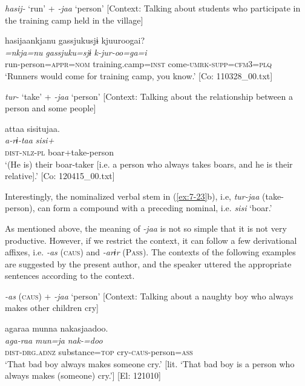 \ea \label{ex:7:23}\ea \label{ex:7:a}\textit{hasij-} ‘run’ + \textit{{}-jaa} ‘person’ [Context: Talking about students who participate in the training camp held in the village]

{\TM}
\glll  hasijaankjanu  {\textbar}gassjuku{\textbar}sjɨ  kjuuroogai?\\
\textit{=nkja=nu}  \textit{gassjuku=sjɨ}  \textit{k-jur-oo=ga=i}\\
run-person=\textsc{appr}=\textsc{nom}  training.camp=\textsc{inst}  come-\textsc{umrk}-\textsc{supp}=\textsc{cfm}3=\textsc{plq}\\
\glt ‘Runners would come for training camp, you know.’ [Co: 110328\_00.txt]

\ex \label{ex:7:b}\textit{tur-} ‘take’ + \textit{{}-jaa} ‘person’ [Context: Talking about the relationship between a person and some people]

{\TM}
\glll  attaa   sisitujaa.\\
\textit{a-rɨ-taa}  \textit{sisi+}\\
\textsc{dist}-\textsc{nlz}-\textsc{pl}  boar+take-person\\
\glt ‘(He is) their boar-taker [i.e. a person who always takes boars, and he is their relative].’ [Co: 120415\_00.txt]

\z
\z

Interestingly, the nominalized verbal stem in (\ref{ex:7-23}b), i.e, \textit{tur-jaa} (take-person), can form a compound with a preceding nominal, i.e. \textit{sisi} ‘boar.’

As mentioned above, the meaning of \textit{{}-jaa} is not so simple that it is not very productive. However, if we restrict the context, it can follow a few derivational affixes, i.e. \textit{{}-as} (\textsc{caus}) and \textit{{}-arɨr} (P\textsc{ass}). The contexts of the following examples are suggested by the present author, and the speaker uttered the appropriate sentences according to the context.

\ea \label{ex:7:24}
\ea \label{ex:7:24a}\textit{{}-as} (\textsc{caus}) + \textit{{}-jaa} ‘person’ [Context: Talking about a naughty boy who always makes other children cry]

{\TM}
\glll  agaraa  munna  nakasjaadoo.\\
\textit{aga-raa}  \textit{mun=ja}  \textit{nak-=doo}\\
\textsc{dist}-\textsc{drg}.\textsc{adnz}  substance=\textsc{top}  cry-\textsc{caus}-person=\textsc{ass}\\
\glt ‘That bad boy always makes someone cry.’ [lit. ‘That bad boy is a person who always makes (someone) cry.’] [El: 121010]

